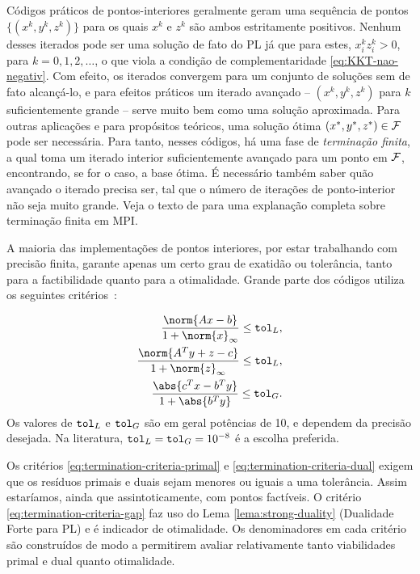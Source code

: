 Códigos práticos de pontos-interiores  geralmente geram uma sequência de
pontos  $\{(x^k,y^k,z^k)\}$ para os quais $x^k$ e $z^k$
são ambos estritamente positivos. Nenhum desses iterados pode ser uma solução de
fato do \ac{PL} já que para estes, $x^k_iz^k_i>0$, para $k=0,1,2,\ldots$, o que
viola a condição de complementaridade \eqref{eq:KKT-nao-negativ}. Com efeito, os
iterados convergem para um conjunto de soluções sem de fato alcançá-lo, e para
efeitos práticos um iterado avançado  -- $(x^k,y^k,z^k)$ para $k$ suficientemente
grande --  serve muito bem como uma solução aproximada. Para outras aplicações e
para propósitos teóricos, uma solução ótima $(x^*,y^*,z^*)\in\mathcal{F}$ pode ser
necessária. Para tanto, nesses códigos,  há uma fase de
\emph{terminação finita}, a qual toma um iterado interior suficientemente avançado
para um ponto em $\mathcal{F}$, encontrando, se for o caso, a base ótima. É
necessário também saber quão avançado o iterado precisa ser, tal que
 o número de iterações de ponto-interior não seja muito grande. Veja o texto de \textcite[Cap. 7]{Wright:Primal-dual-interior-point:1997h} para uma explanação completa sobre terminação finita em \ac{MPI}.

A maioria das implementações de pontos interiores, por estar trabalhando com
precisão finita, garante apenas um certo grau de exatidão ou tolerância, tanto para a factibilidade quanto para a otimalidade. Grande parte
dos códigos utiliza os seguintes critérios~\cite{Gondzio:1996:CVI,Czyzyk:1999hk}:	


\begin{subequations}
\label{eq:termination-criteria}
\begin{align}
	\dfrac{\norm{Ax - b}}{1 + \norm{x}_{\infty}} \leq \tolL,
	\label{eq:termination-criteria-primal}\\ 
	\dfrac{\norm{A^Ty + z - c}}{1 + \norm{z}_{\infty}} \leq
	\tolL,\label{eq:termination-criteria-dual} \\ 
	\dfrac{\abs{c^Tx - b^T y}}{1 + \abs{b^Ty}}\leq
	\tolG.\label{eq:termination-criteria-gap}
\end{align}
\end{subequations}
Os valores de $\mathtt{tol}_{L}$ e $\mathtt{tol}_{G}$ são em geral potências de 10, e  dependem da precisão desejada. Na literatura,  $\mathtt{tol}_{L}=\mathtt{tol}_{G}=10^{-8}$ é a escolha preferida.  


Os critérios
\eqref{eq:termination-criteria-primal} e \eqref{eq:termination-criteria-dual}
exigem que os resíduos primais e duais sejam menores ou iguais a uma tolerância.
Assim estaríamos, ainda que assintoticamente, com pontos factíveis. O critério
\eqref{eq:termination-criteria-gap} faz uso do Lema
\ref{lema:strong-duality} (Dualidade Forte para \ac{PL}) e é indicador de
otimalidade. Os denominadores em cada critério são construídos de modo a 
permitirem avaliar relativamente tanto viabilidades primal e dual quanto
otimalidade.
  
